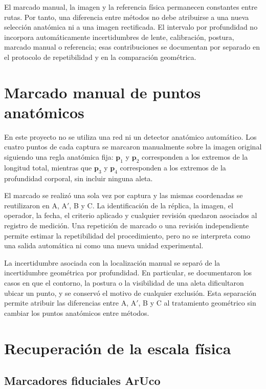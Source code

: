 \documentclass{report}
\newcommand{\Aprime}{A$'$}
\begin{document}
El marcado manual, la imagen y la referencia física permanecen constantes entre rutas. Por tanto, una diferencia entre métodos no debe atribuirse a una nueva selección anatómica ni a una imagen rectificada. El intervalo por profundidad no incorpora automáticamente incertidumbres de lente, calibración, postura, marcado manual o referencia; esas contribuciones se documentan por separado en el protocolo de repetibilidad y en la comparación geométrica.

\section{Marcado manual de puntos anatómicos}

En este proyecto no se utiliza una red ni un detector anatómico automático. Los cuatro puntos de cada captura se marcaron manualmente sobre la imagen original siguiendo una regla anatómica fija: $\mathbf{p}_1$ y $\mathbf{p}_2$ corresponden a los extremos de la longitud total, mientras que $\mathbf{p}_3$ y $\mathbf{p}_4$ corresponden a los extremos de la profundidad corporal, sin incluir ninguna aleta.

El marcado se realizó una sola vez por captura y las mismas coordenadas se reutilizaron en A, \Aprime, B y C. La identificación de la réplica, la imagen, el operador, la fecha, el criterio aplicado y cualquier revisión quedaron asociados al registro de medición. Una repetición de marcado o una revisión independiente permite estimar la repetibilidad del procedimiento, pero no se interpreta como una salida automática ni como una nueva unidad experimental.

La incertidumbre asociada con la localización manual se separó de la incertidumbre geométrica por profundidad. En particular, se documentaron los casos en que el contorno, la postura o la visibilidad de una aleta dificultaron ubicar un punto, y se conservó el motivo de cualquier exclusión. Esta separación permite atribuir las diferencias entre A, \Aprime, B y C al tratamiento geométrico sin cambiar los puntos anatómicos entre métodos.

\section{Recuperación de la escala física}

\subsection{Marcadores fiduciales ArUco}
\end{document}
